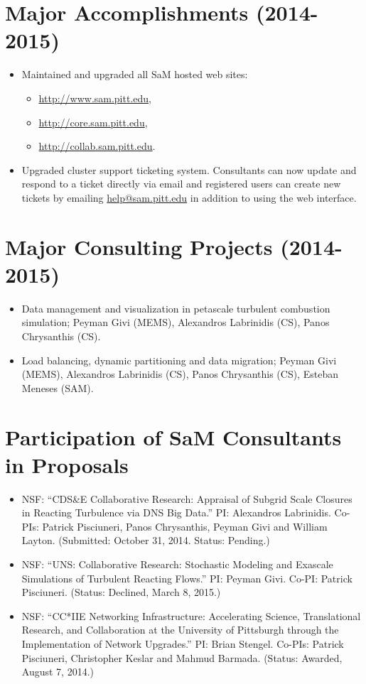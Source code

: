 \documentclass{article}
\begin{document}
\section*{Major Accomplishments (2014-2015)}
\begin{itemize}
\item Maintained and upgraded all SaM hosted web sites:
\begin{itemize}
\item \url{http://www.sam.pitt.edu}, 
\item \url{http://core.sam.pitt.edu}, 
\item \url{http://collab.sam.pitt.edu}.
\end{itemize}
\item Upgraded cluster support ticketing system.  Consultants can now update and respond to a ticket directly via email and registered users can create new tickets by emailing \url{help@sam.pitt.edu} in addition to using the web interface.
\end{itemize}
\section*{Major Consulting Projects (2014-2015)}
\begin{itemize}
\item Data management and visualization in petascale turbulent combustion simulation; Peyman Givi (MEMS), Alexandros Labrinidis (CS), Panos Chrysanthis (CS).
\item Load balancing, dynamic partitioning and data migration; Peyman Givi (MEMS), Alexandros Labrinidis (CS), Panos Chrysanthis (CS), Esteban Meneses (SAM).
\end{itemize}
\section*{Participation of SaM Consultants in Proposals}
\begin{itemize}
\item NSF: ``CDS\&E Collaborative Research: Appraisal of Subgrid Scale Closures in Reacting Turbulence via DNS Big Data.'' PI: Alexandros Labrinidis.  Co-PIs: Patrick Pisciuneri, Panos Chrysanthis, Peyman Givi and William Layton. (Submitted: October 31, 2014.  Status: Pending.)
\item NSF: ``UNS: Collaborative Research: Stochastic Modeling and Exascale Simulations of Turbulent Reacting Flows.''  PI: Peyman Givi.  Co-PI: Patrick Pisciuneri.  (Status: Declined, March 8, 2015.)
\item NSF: ``CC*IIE Networking Infrastructure: Accelerating Science, Translational Research, and Collaboration at the University of Pittsburgh through the Implementation of Network Upgrades.''  PI: Brian Stengel.  Co-PIs: Patrick Pisciuneri, Christopher Keslar and Mahmud Barmada. (Status: Awarded, August 7, 2014.)
\end{itemize}
\end{document}
